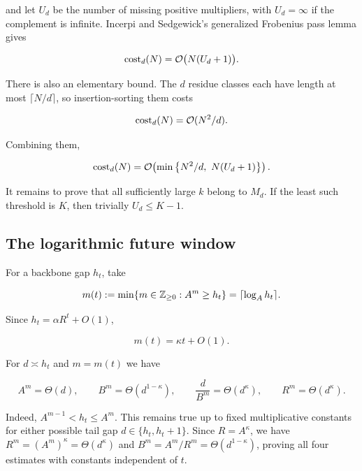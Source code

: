 and let $U_d$ be the number of missing positive multipliers, with
$U_d=\infty$ if the complement is infinite.  Incerpi and Sedgewick's
generalized Frobenius pass lemma gives~\cite[Lemma~1,
pp.~212--213]{incerpi1985}

\begin{equation}
  \operatorname{cost}_d(N)=\mathcal{O}\bigl(N(U_d+1)\bigr).
  \label{eq:frobenius-pass}
\end{equation}

There is also an elementary bound.  The $d$ residue classes each have length
at most $\lceil N/d\rceil$, so insertion-sorting them costs

\begin{equation}
  \operatorname{cost}_d(N)=\mathcal{O}(N^2/d).
  \label{eq:trivial-pass}
\end{equation}

Combining them,

\begin{equation}
  \operatorname{cost}_d(N)=\mathcal{O}\!\left(
    \min\left\{N^2/d,\ N(U_d+1)\right\}
  \right).
  \label{eq:combined-pass}
\end{equation}

It remains to prove that all sufficiently large $k$ belong to $M_d$.  If the
least such threshold is $K$, then trivially $U_d\le K-1$.

\subsection{The logarithmic future window}

For a backbone gap $h_t$, take

\begin{equation}
  m(t):=\min\{m\in\mathbb{Z}_{\ge0}:A^m\ge h_t\}
       =\lceil\log_A h_t\rceil.
  \label{eq:window}
\end{equation}

Since $h_t=\alpha R^t+O(1)$,

\begin{equation}
  m(t)=\kappa t+O(1).
  \label{eq:window-index}
\end{equation}

For $d\asymp h_t$ and $m=m(t)$ we have

\begin{equation}
  A^m=\Theta(d),\qquad
  B^m=\Theta(d^{1-\kappa}),\qquad
  \frac d{B^m}=\Theta(d^\kappa),\qquad
  R^m=\Theta(d^\kappa).
  \label{eq:window-scales}
\end{equation}

Indeed, $A^{m-1}<h_t\le A^m$.  This remains true up to fixed multiplicative
constants for either possible tail gap $d\in\{h_t,h_t+1\}$.  Since
$R=A^\kappa$, we have $R^m=(A^m)^\kappa=\Theta(d^\kappa)$ and
$B^m=A^m/R^m=\Theta(d^{1-\kappa})$, proving all four estimates with constants
independent of $t$.

